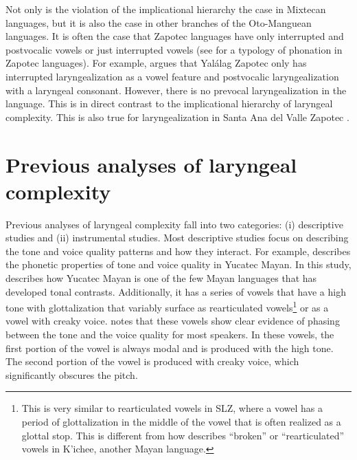 Not only is the violation of the implicational hierarchy the case in Mixtecan languages, but it is also the case in other branches of the Oto-Manguean languages. It is often the case that Zapotec languages have only interrupted and postvocalic vowels or just interrupted vowels (see \cite{ariza-garciaPhonationTypesTones2018} for a typology of phonation in Zapotec languages). For example, \citet{avelinoTopicsYalalagZapotec2004,avelinoAcousticElectroglottographicAnalyses2010} argues that Yalálag Zapotec only has interrupted laryngealization as a vowel feature and postvocalic laryngealization with a laryngeal consonant. However, there is no prevocal laryngealization in the language. This is in direct contrast to the implicational hierarchy of laryngeal complexity. This is also true for laryngealization in Santa Ana del Valle Zapotec \citep{espositoSantaAnaValle2004,espositoAcousticElectroglottographicStudy2012}.

\section{Previous analyses of laryngeal complexity}\label{sec:previous_analyses}

Previous analyses of laryngeal complexity fall into two categories: (i) descriptive studies and (ii) instrumental studies. Most descriptive studies focus on describing the tone and voice quality patterns and how they interact. For example, \citet{frazierPhoneticsYucatecMaya2013} describes the phonetic properties of tone and voice quality in Yucatec Mayan. In this study, \citeauthor{frazierPhoneticsYucatecMaya2013} describes how Yucatec Mayan is one of the few Mayan languages that has developed tonal contrasts. Additionally, it has a series of vowels that have a high tone with glottalization that variably surface as rearticulated vowels\footnote{This is very similar to rearticulated vowels in SLZ, where a vowel has a period of glottalization in the middle of the vowel that is often realized as a glottal stop. This is different from how \citet{bairdPhoneticPhonologicalRealizations2011} describes ``broken'' or ``rearticulated'' vowels in K'ichee, another Mayan language.} or as a vowel with creaky voice. \citeauthor{frazierPhoneticsYucatecMaya2013} notes that these vowels show clear evidence of phasing between the tone and the voice quality for most speakers. In these vowels, the first portion of the vowel is always modal and is produced with the high tone. The second portion of the vowel is produced with creaky voice, which significantly obscures the pitch. 

